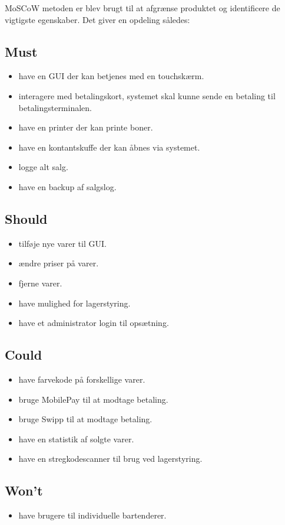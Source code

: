 MoSCoW metoden er blev brugt til at afgrænse produktet og identificere de vigtigste egenskaber. Det giver en opdeling således:

\subsection{Must}
\begin{itemize}
\item have en GUI der kan betjenes med en touchskærm.
\item interagere med betalingskort, systemet skal kunne sende en betaling til betalingsterminalen.
\item have en printer der kan printe boner.
\item have en kontantskuffe der kan åbnes via systemet.
\item logge alt salg.
\item have en backup af salgslog.
\end{itemize}

\subsection{Should}
\begin{itemize}
\item tilføje nye varer til GUI.
\item ændre priser på varer.
\item fjerne varer.
\item have mulighed for lagerstyring.
\item have et administrator login til opsætning.
\end{itemize}

\subsection{Could}
\begin{itemize}
\item have farvekode på forskellige varer.
\item bruge MobilePay til at modtage betaling.
\item bruge Swipp til at modtage betaling.
\item have en statistik af solgte varer.
\item have en stregkodescanner til brug ved lagerstyring.
\end{itemize}

\subsection{Won't}
\begin{itemize}
\item have brugere til individuelle bartenderer.
\end{itemize}